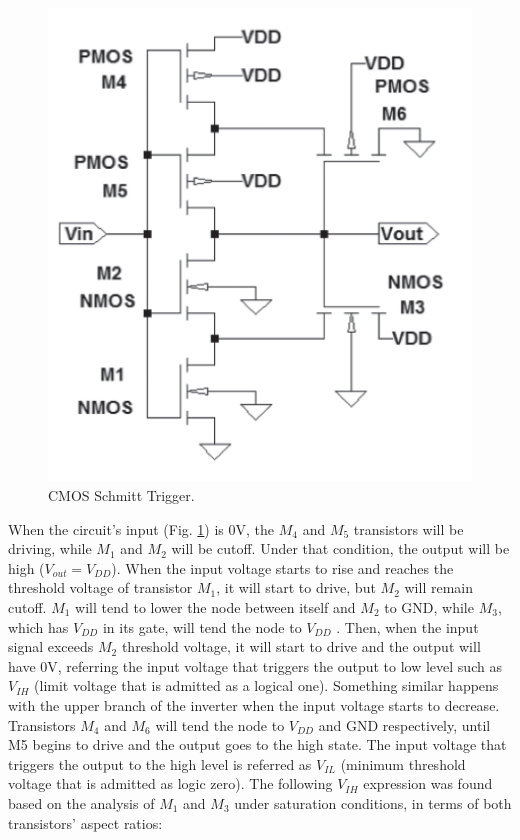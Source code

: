 \documentclass[a4paper, 10pt, conference]{ieeeconf}      %
\begin{document}
\begin{figure}[H]
\centering
\includegraphics[scale=0.4]{Images/ImagenesTesina/Antecedentes/Schmitt_Trigger.PNG}
\caption{CMOS Schmitt Trigger.}
\label{fig:Schmit}
\end{figure}

When the circuit’s input (Fig. \ref{fig:Schmit}) is 0V, the $M_4$ and $M_5$ transistors will be driving, while $M_1$ and $M_2$ will be cutoff. Under that condition, the output will be high ($V_{out} = V_{DD}$). When the input voltage starts to rise and reaches the threshold voltage of transistor $M_1$, it will start to drive, but $M_2$ will remain cutoff. $M_1$ will tend to lower the node between itself and $M_2$ to GND, while $M_3$, which has $V_{DD}$ in its gate, will tend the node to $V_{DD}$ . Then, when the input signal exceeds $M_2$ threshold voltage, it will start to drive and the output will have 0V, referring the input voltage that triggers the output to low level such as $V_{IH}$ (limit voltage that is admitted as a logical one). Something similar happens with the upper branch of the inverter when the input voltage starts to decrease. Transistors $M_4$ and $M_6$ will tend the node to $V_{DD}$  and GND respectively, until M5 begins to drive and the output goes to the high state. The input voltage that triggers the output to the high level is referred as $V_{IL}$ (minimum threshold voltage that is admitted as logic zero). The following $V_{IH}$ expression was found based on the analysis of $M_1$ and $M_3$ under saturation conditions, in terms of both transistors’ aspect ratios:
\end{document}

